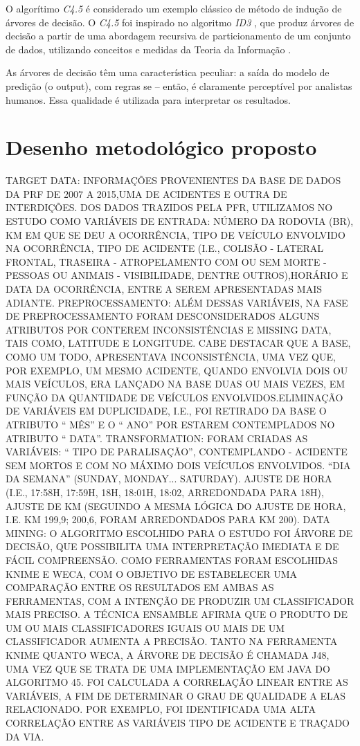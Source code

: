 \documentclass[conference,compsoc]{IEEEtran}
\begin{document}
O algorítimo \textit{C4.5} é considerado um exemplo clássico de método de indução de árvores de decisão. O \textit{C4.5} \cite{Learning2007} foi inspirado no algoritmo 
\textit{ID3} \cite{Learning1979}, que produz árvores de decisão a partir de uma abordagem recursiva de particionamento de um conjunto de dados, utilizando conceitos e medidas 
da Teoria da Informação \cite{TeoriaInf}.

As árvores de decisão têm uma característica peculiar: a saída do modelo de predição (o output), com regras se -- então, é claramente perceptível por analistas humanos.
Essa qualidade é utilizada para interpretar os resultados.


\section{Desenho metodológico proposto}

TARGET DATA: INFORMAÇÕES PROVENIENTES DA BASE DE DADOS DA PRF DE 2007 A 2015,UMA DE ACIDENTES E OUTRA DE INTERDIÇÕES. DOS DADOS TRAZIDOS PELA PFR, UTILIZAMOS NO ESTUDO
COMO VARIÁVEIS DE ENTRADA: NÚMERO DA RODOVIA (BR), KM EM QUE SE DEU A OCORRÊNCIA, TIPO DE VEÍCULO ENVOLVIDO NA OCORRÊNCIA, TIPO DE ACIDENTE (I.E., COLISÃO - LATERAL
FRONTAL, TRASEIRA - ATROPELAMENTO COM OU SEM MORTE - PESSOAS OU ANIMAIS - VISIBILIDADE, DENTRE OUTROS),HORÁRIO E DATA DA OCORRÊNCIA, ENTRE A SEREM APRESENTADAS MAIS ADIANTE.
PREPROCESSAMENTO: ALÉM DESSAS VARIÁVEIS, NA FASE DE PREPROCESSAMENTO FORAM DESCONSIDERADOS ALGUNS ATRIBUTOS POR CONTEREM INCONSISTÊNCIAS E MISSING DATA, TAIS COMO, LATITUDE E LONGITUDE.
CABE DESTACAR QUE A BASE, COMO UM TODO, APRESENTAVA INCONSISTÊNCIA, UMA VEZ QUE, POR EXEMPLO, UM MESMO ACIDENTE, QUANDO ENVOLVIA DOIS OU MAIS VEÍCULOS,
ERA LANÇADO NA BASE DUAS OU MAIS VEZES, EM FUNÇÃO DA QUANTIDADE DE VEÍCULOS ENVOLVIDOS.ELIMINAÇÃO DE VARIÁVEIS EM DUPLICIDADE, I.E., FOI RETIRADO DA BASE
O ATRIBUTO `` MÊS'' E O `` ANO'' POR ESTAREM CONTEMPLADOS NO ATRIBUTO `` DATA''.
TRANSFORMATION: FORAM CRIADAS AS VARIÁVEIS: `` TIPO DE PARALISAÇÃO'', CONTEMPLANDO - ACIDENTE SEM MORTOS E COM NO MÁXIMO DOIS VEÍCULOS ENVOLVIDOS.
``DIA DA SEMANA'' (SUNDAY, MONDAY... SATURDAY). AJUSTE DE HORA (I.E., 17:58H, 17:59H, 18H, 18:01H, 18:02, ARREDONDADA PARA 18H), AJUSTE DE KM (SEGUINDO A MESMA LÓGICA
DO AJUSTE DE HORA, I.E. KM 199,9; 200,6, FORAM ARREDONDADOS PARA KM 200). 
DATA MINING: O ALGORITMO ESCOLHIDO PARA O ESTUDO FOI ÁRVORE DE DECISÃO, QUE POSSIBILITA UMA INTERPRETAÇÃO IMEDIATA E DE FÁCIL COMPREENSÃO. COMO FERRAMENTAS FORAM 
ESCOLHIDAS KNIME E WECA, COM O OBJETIVO DE ESTABELECER UMA COMPARAÇÃO ENTRE OS RESULTADOS EM AMBAS AS FERRAMENTAS, COM A INTENÇÃO DE PRODUZIR UM CLASSIFICADOR
MAIS PRECISO. A TÉCNICA ENSAMBLE AFIRMA QUE O PRODUTO DE UM OU MAIS CLASSIFICADORES IGUAIS OU MAIS DE UM CLASSIFICADOR AUMENTA A PRECISÃO.
TANTO NA FERRAMENTA KNIME QUANTO WECA, A ÁRVORE DE DECISÃO É CHAMADA J48, UMA VEZ QUE SE TRATA DE UMA IMPLEMENTAÇÃO EM JAVA DO ALGORITMO 45.
FOI CALCULADA A CORRELAÇÃO LINEAR ENTRE AS VARIÁVEIS, A FIM DE DETERMINAR O GRAU DE QUALIDADE A ELAS RELACIONADO. POR EXEMPLO, FOI IDENTIFICADA UMA ALTA 
CORRELAÇÃO ENTRE AS VARIÁVEIS TIPO DE ACIDENTE E TRAÇADO DA VIA.
\end{document}
